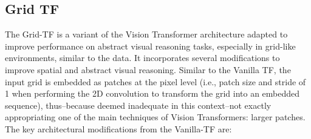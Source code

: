 \subsection{Grid TF} \label{sec:grid_vit_model_details_appendix}
The Grid-TF is a variant of the Vision Transformer architecture adapted to improve performance on abstract visual reasoning tasks, especially in grid-like environments, similar to the \generatorName \;data. It incorporates several modifications to improve spatial and abstract visual reasoning. Similar to the Vanilla TF, the input grid is embedded as patches at the pixel level (i.e., patch size and stride of 1 when performing the 2D convolution to transform the grid into an embedded sequence), thus--because deemed inadequate in this context--not exactly appropriating one of the main techniques of Vision Transformers: larger patches.
\newpage
The key architectural modifications from the Vanilla-TF are:
